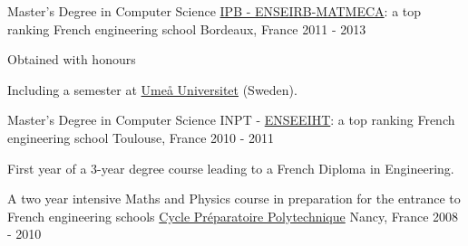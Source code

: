 
	\begin{cventries}
	
		\cventry
			{Master's Degree in Computer Science}
			{\href{https://enseirb-matmeca.bordeaux-inp.fr/fr}{IPB - ENSEIRB-MATMECA}: a top ranking French engineering school}
			{Bordeaux, France}
			{2011 - 2013}
			{	
				\begin{cvitems}
					\item Obtained with honours
					\item Including a semester at \href{http://www.umu.se}{Ume\aa{} Universitet} (Sweden).
				\end{cvitems}
			}
		
		
		\cventry
			{Master's Degree in Computer Science}
			{INPT - \href{http://www.enseeiht.fr}{ENSEEIHT}: a top ranking French engineering school}
			{Toulouse, France}
			{2010 - 2011}
			{
				\begin{cvitems}
					\item First year of a 3-year degree course leading to a French Diploma in Engineering.
				\end{cvitems}
			}
		
		\cventry
			{A two year intensive Maths and Physics course in preparation for the entrance to French engineering schools}
			{\href{http://www.la-prepa-des-inp.fr}{Cycle Préparatoire Polytechnique}}
			{Nancy, France}
			{2008 - 2010}
			{}
		
		
	
	\end{cventries}
